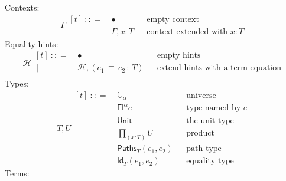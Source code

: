 \documentclass{article}
\newcommand{\G}{\Gamma} %
\newcommand{\T}{T} %
\newcommand{\U}{U} %
\newcommand{\x}{x} %
\newcommand{\e}{e} %
\newcommand{\bnf}{\ \mathrel{{:}{:}{=}}\ }
\newcommand{\bnfor}{\ \mid\ \ }
\newcommand{\ctxempty}{\bullet} %
\newcommand{\ctxextend}[3]{#1, #2 {:} #3} %
\newcommand{\Universe}[1]{\mathbb{U}_{#1}} %
\newcommand{\El}[2]{\mathsf{El}^{#1} #2} %
\newcommand{\Unit}{\mathsf{Unit}} %
\newcommand{\Prod}[2]{{\textstyle\prod_{(#1 {:} #2)}}} %
\newcommand{\PrEqual}[3]{\mathsf{Paths}_{#1}(#2,#3)} %
\newcommand{\JuEqual}[3]{\mathsf{Id}_{#1}(#2,#3)} %
\newcommand{\eqtermhint}[3]{(#1 \,{\equiv}\, #2 \,{:}\, #3)}
\renewcommand{\H}{\mathcal{H}}      %
\newcommand{\hintextend}[2]{#1, #2} %
\begin{document}
Contexts:
%
\begin{equation*}
  \G
  \begin{aligned}[t]
    \bnf   {}& \ctxempty & & \text{empty context}\\
    \bnfor {}& \ctxextend{\G}{\x}{\T} & & \text{context extended with $x : T$}
  \end{aligned}
\end{equation*}
%
Equality hints:
%
\begin{equation*}
  \H
  \begin{aligned}[t]
    \bnf   {}& \ctxempty & & \text{empty hints}\\
    \bnfor {}& \hintextend{\H}{\eqtermhint{\e_1}{\e_2}{\T}} & & \text{extend hints with a term equation} \\
  \end{aligned}
\end{equation*}
%
Types:
%
\begin{equation*}
  \T, \U
  \begin{aligned}[t]
    \bnf   {}& \Universe{\alpha} & & \text{universe}\\
    \bnfor {}& \El{\alpha}{\e} & & \text{type named by $e$}\\
    \bnfor {}& \Unit & & \text{the unit type}\\
    \bnfor {}& \Prod{x}{\T} \U & & \text{product}\\
    \bnfor {}& \PrEqual{T}{\e_1}{\e_2} & & \text{path type}\\
    \bnfor {}& \JuEqual{T}{\e_1}{\e_2} & & \text{equality type}   
  \end{aligned}
\end{equation*}
%
Terms:
%
\end{document}
